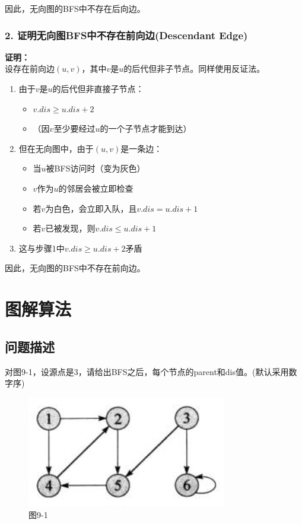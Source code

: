 \documentclass{article}
\begin{document}
\noindent 因此，无向图的BFS中不存在后向边。

\subsubsection{2. 证明无向图BFS中不存在前向边(Descendant Edge)}

\noindent\textbf{证明：}\\
设存在前向边$(u,v)$，其中$v$是$u$的后代但非子节点。同样使用反证法。

\begin{enumerate}
    \item 由于$v$是$u$的后代但非直接子节点：
    \begin{itemize}
        \item $v.dis \geq u.dis + 2$
        \item （因$v$至少要经过$u$的一个子节点才能到达）
    \end{itemize}
    
    \item 但在无向图中，由于$(u,v)$是一条边：
    \begin{itemize}
        \item 当$u$被BFS访问时（变为灰色）
        \item $v$作为$u$的邻居会被立即检查
        \item 若$v$为白色，会立即入队，且$v.dis = u.dis + 1$
        \item 若$v$已被发现，则$v.dis \leq u.dis + 1$
    \end{itemize}
    
    \item 这与步骤1中$v.dis \geq u.dis + 2$矛盾
\end{enumerate}

\noindent 因此，无向图的BFS中不存在前向边。

\section{图解算法}

\subsection{问题描述}

对图9-1，设源点是3，请给出BFS之后，每个节点的parent和dis值。(默认采用数字序)

\begin{figure}[h]
    \centering
    \includegraphics[width=0.5\linewidth]{Figure/9-1.png}
    \caption{图9-1}
    \label{fig:9-1 raw}
\end{figure}
\end{document}
